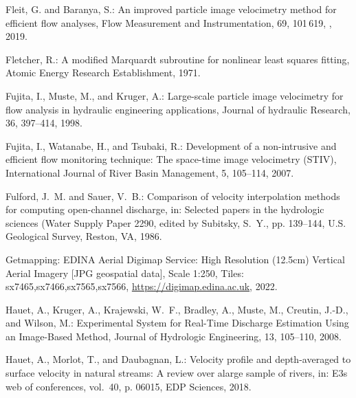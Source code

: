 \documentclass[hess, manuscript]{copernicus} %
\begin{document}
\begin{thebibliography}{70}
Fleit, G. and Baranya, S.: An improved particle image velocimetry method for
  efficient flow analyses, Flow Measurement and Instrumentation, 69, 101\,619,
  , 2019.

Fletcher, R.: A modified Marquardt subroutine for nonlinear least squares
  fitting, Atomic Energy Research Establishment, 1971.

Fujita, I., Muste, M., and Kruger, A.: Large-scale particle image velocimetry
  for flow analysis in hydraulic engineering applications, Journal of hydraulic
  Research, 36, 397--414, 1998.

Fujita, I., Watanabe, H., and Tsubaki, R.: Development of a non-intrusive and
  efficient flow monitoring technique: The space-time image velocimetry (STIV),
  International Journal of River Basin Management, 5, 105--114, 2007.

Fulford, J.~M. and Sauer, V.~B.: Comparison of velocity interpolation methods
  for computing open-channel discharge, in: Selected papers in the hydrologic
  sciences (Water Supply Paper 2290, edited by Subitsky, S.~Y., pp. 139--144,
  U.S. Geological Survey, Reston, VA, 1986.

{Getmapping: EDINA Aerial Digimap Service}: High Resolution (12.5cm) Vertical
  Aerial Imagery [JPG geospatial data], Scale 1:250, Tiles:
  sx7465,sx7466,sx7565,sx7566, \urlprefix\url{https://digimap.edina.ac.uk},
  2022.

Hauet, A., Kruger, A., Krajewski, W.~F., Bradley, A., Muste, M., Creutin,
  J.-D., and Wilson, M.: Experimental System for Real-Time Discharge Estimation
  Using an Image-Based Method, Journal of Hydrologic Engineering, 13, 105--110,
  2008.

Hauet, A., Morlot, T., and Daubagnan, L.: Velocity profile and depth-averaged
  to surface velocity in natural streams: A review over alarge sample of
  rivers, in: E3s web of conferences, vol.~40, p. 06015, EDP Sciences, 2018.


\end{thebibliography}
\end{document}
